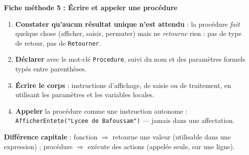\documentclass[11pt]{article}
\begin{document}
\textbf{Fiche méthode 5 : Écrire et appeler une procédure}\par
\begin{methode}
\begin{enumerate}
\item \textbf{Constater qu'aucun résultat unique n'est attendu} : la procédure \emph{fait} quelque chose (afficher, saisir, permuter) mais ne \emph{retourne} rien : pas de type de retour, pas de \texttt{Retourner}.
\item \textbf{Déclarer} avec le mot-clé \texttt{Procedure}, suivi du nom et des paramètres formels typés entre parenthèses.
\item \textbf{Écrire le corps} : instructions d'affichage, de saisie ou de traitement, en utilisant les paramètres et les variables locales.
\item \textbf{Appeler} la procédure comme une instruction autonome : \texttt{AfficherEntete("Lycee de Bafoussam")} — jamais dans une affectation.
\end{enumerate}
\textbf{Différence capitale} : fonction $\Rightarrow$ retourne une valeur (utilisable dans une expression) ; procédure $\Rightarrow$ exécute des actions (appelée seule, sur une ligne).
\end{methode}
\end{document}
